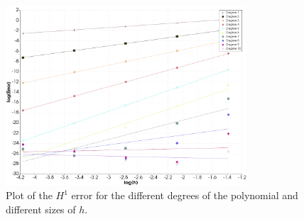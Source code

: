 \begin{figure}
    \begin{centering}
    \includegraphics[width=0.8\textwidth]{Afsnit/Application/figurer/h1-fejl_plot.png}
    \caption{Plot of the $H^1$ error for the different degrees of the polynomial and different sizes of $h$.}
    \label{fig:h1-fejl-plot}
    \end{centering}
\end{figure}